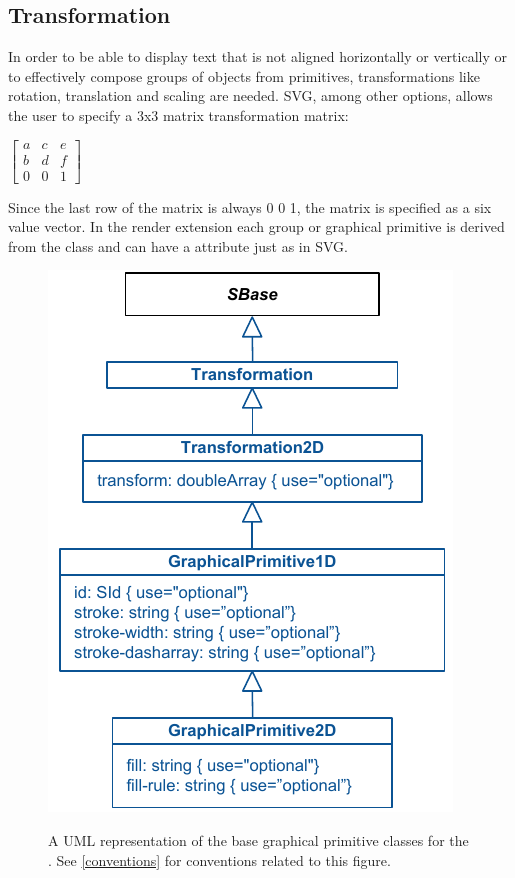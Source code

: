 \subsection{Transformation}

In order to be able to display text that is not aligned horizontally or 
vertically or to effectively compose groups of objects from primitives, 
transformations like rotation, translation and scaling are needed. SVG, among 
other options, allows the user to specify a 3x3 matrix transformation matrix: 

\hspace*{0.4cm}
\begin{center}
\begin{math}\left[ \begin{array}{ccc} a & c & e \\ b & d & f \\ 0 & 0 & 1\end{array}\right]\end{math}
\end{center}
\hspace*{0.4cm}

Since the last row of the matrix is always 0 0 1, the matrix is specified as a 
six value vector. In the render extension each group or graphical 
primitive is derived from the class \TransformationTwoD and can have a  attribute just as in SVG.

\begin{figure}[!ht]
  \centering
  \includegraphics{images/render-base-classes-uml}\\
  \caption{A UML representation of the base graphical primitive classes for the \RenderPackage.  See \ref{conventions} for conventions related to this figure. }
  \label{fig:base_render_uml}
\end{figure}


